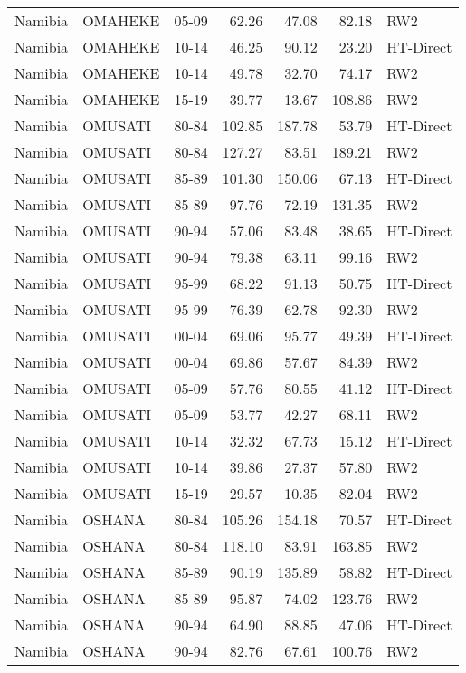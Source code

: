 \begin{longtable}{lllrrrl}
  Namibia & OMAHEKE & 05-09 & 62.26 & 47.08 & 82.18 & RW2 \\ 
  Namibia & OMAHEKE & 10-14 & 46.25 & 90.12 & 23.20 & HT-Direct \\ 
  Namibia & OMAHEKE & 10-14 & 49.78 & 32.70 & 74.17 & RW2 \\ 
  Namibia & OMAHEKE & 15-19 & 39.77 & 13.67 & 108.86 & RW2 \\ 
  Namibia & OMUSATI & 80-84 & 102.85 & 187.78 & 53.79 & HT-Direct \\ 
  Namibia & OMUSATI & 80-84 & 127.27 & 83.51 & 189.21 & RW2 \\ 
  Namibia & OMUSATI & 85-89 & 101.30 & 150.06 & 67.13 & HT-Direct \\ 
  Namibia & OMUSATI & 85-89 & 97.76 & 72.19 & 131.35 & RW2 \\ 
  Namibia & OMUSATI & 90-94 & 57.06 & 83.48 & 38.65 & HT-Direct \\ 
  Namibia & OMUSATI & 90-94 & 79.38 & 63.11 & 99.16 & RW2 \\ 
  Namibia & OMUSATI & 95-99 & 68.22 & 91.13 & 50.75 & HT-Direct \\ 
  Namibia & OMUSATI & 95-99 & 76.39 & 62.78 & 92.30 & RW2 \\ 
  Namibia & OMUSATI & 00-04 & 69.06 & 95.77 & 49.39 & HT-Direct \\ 
  Namibia & OMUSATI & 00-04 & 69.86 & 57.67 & 84.39 & RW2 \\ 
  Namibia & OMUSATI & 05-09 & 57.76 & 80.55 & 41.12 & HT-Direct \\ 
  Namibia & OMUSATI & 05-09 & 53.77 & 42.27 & 68.11 & RW2 \\ 
  Namibia & OMUSATI & 10-14 & 32.32 & 67.73 & 15.12 & HT-Direct \\ 
  Namibia & OMUSATI & 10-14 & 39.86 & 27.37 & 57.80 & RW2 \\ 
  Namibia & OMUSATI & 15-19 & 29.57 & 10.35 & 82.04 & RW2 \\ 
  Namibia & OSHANA & 80-84 & 105.26 & 154.18 & 70.57 & HT-Direct \\ 
  Namibia & OSHANA & 80-84 & 118.10 & 83.91 & 163.85 & RW2 \\ 
  Namibia & OSHANA & 85-89 & 90.19 & 135.89 & 58.82 & HT-Direct \\ 
  Namibia & OSHANA & 85-89 & 95.87 & 74.02 & 123.76 & RW2 \\ 
  Namibia & OSHANA & 90-94 & 64.90 & 88.85 & 47.06 & HT-Direct \\ 
  Namibia & OSHANA & 90-94 & 82.76 & 67.61 & 100.76 & RW2 \\ 

\end{longtable}
